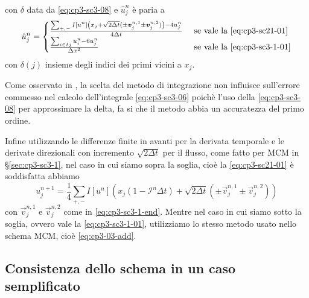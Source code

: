 con $\delta$ data da \eqref{eq:cp3-sc3-08} e $\hat{u}_j^n$ è paria a 
\[
\hat{u}_j^n=
\begin{cases}
\frac{\sum_{+,-}I[u^n]\left(x_j+\sqrt{2\Delta
    t}(\pm\vec{v}_j^{n,1}\pm\vec{v}_j^{n,2})\right)-4u_j^n}{4\Delta t}
&\text{ se vale la \eqref{eq:cp3-sc21-01}} \\
\frac{\sum_{i\in\delta{j}}u_i^n-6u_j^n}{\Delta x^2}&\text{ se vale la \eqref{eq:cp3-sc3-1-01}}
\end{cases}
\]
con $\delta(j)$ insieme degli indici dei  primi vicini a $x_j$.
\begin{osservazione}
Come osservato in \cite[][§1.5]{osher:fed}, la scelta del metodo di
integrazione non influisce sull'errore commesso nel calcolo
dell'integrale \eqref{eq:cp3-sc3-06} poichè l'uso della
\eqref{eq:cp3-sc3-08} per approssimare la delta, fa si che il  metodo
abbia un accuratezza del primo ordine.
\end{osservazione}
Infine utilizzando le differenze finite in avanti per la derivata
temporale e le derivate direzionali con incremento $\sqrt{2\Delta t}$
per il flusso, come fatto per MCM in §\ref{sec:cp3-sc3-1}, nel caso in
cui siamo sopra la soglia, cioè la \eqref{eq:cp3-sc21-01} è soddisfatta abbiamo
\begin{equation}
  \label{eq:cp3-sc3-09}
  u_j^{n+1}=\frac{1}{4}\sum_{+,-}I[u^n]\left(x_j(1-\mathcal{I}^n\Delta
  t)+ \sqrt{2\Delta t}(\pm\vec{v}_j^{n,1}\pm\vec{v}_j^{n,2})\right)
\end{equation}
con $\vec{v}_j^{n,1}$ e $\vec{v}_j^{n,2}$ come in
\eqref{eq:cp3-sc3-1-end}. Mentre nel caso in cui siamo sotto la
soglia, ovvero vale la \eqref{eq:cp3-sc3-1-01}, utilizziamo lo stesso
metodo usato nello schema MCM, cioè \eqref{eq:cp3-03-add}.
%
\subsection{Consistenza dello schema in un caso semplificato}
  \label{subsec:cp3-sc3-3-2}

